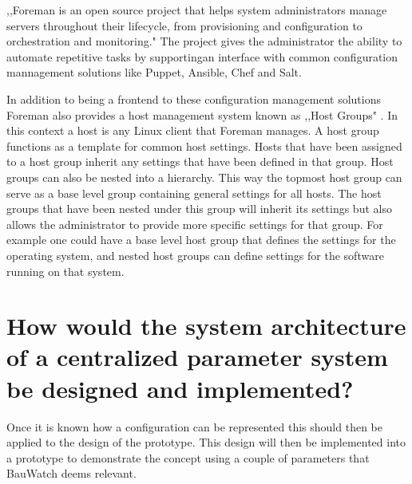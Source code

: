 ,,Foreman is an open source project that helps system administrators manage servers throughout their lifecycle, from provisioning and configuration to orchestration and monitoring." \cite{what_is_foreman}
The project gives the administrator the ability to automate repetitive tasks by supportingan interface with common configuration mannagement solutions like Puppet, Ansible, Chef and Salt.

In addition to being a frontend to these configuration management solutions Foreman also provides a host management system known as ,,Host Groups" \cite{foreman_hostgroups}. In this context a host is any Linux client that Foreman manages.
A host group functions as a template for common host settings.
Hosts that have been assigned to a host group inherit any settings that have been defined in that group.
Host groups can also be nested into a hierarchy.
This way the topmost host group can serve as a base level group containing general settings for all hosts.
The host groups that have been nested under this group will inherit its settings but also allows the administrator to provide more specific settings for that group.
For example one could have a base level host group that defines the settings for the operating system, and nested host groups can define settings for the software running on that system.

\section{How would the system architecture of a centralized parameter system be designed and implemented?}
Once it is known how a configuration can be represented this should then be applied to the design of the prototype. This design will then be implemented into a
prototype to demonstrate the concept using a couple of parameters that BauWatch deems relevant.

